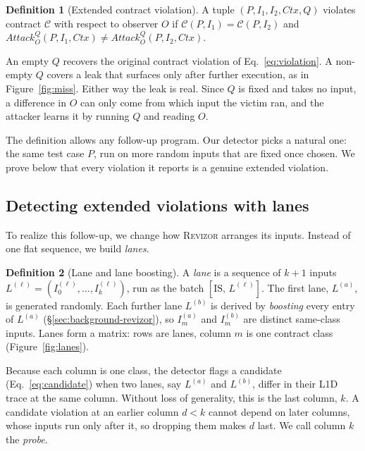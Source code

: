 \documentclass[letterpaper,twocolumn,10pt]{article}
\theoremstyle{definition}
\newtheorem{definition}{Definition}
\providecommand{\IS}{\ensuremath{\mathrm{IS}}}
\providecommand{\obs}{\ensuremath{O}}
\providecommand{\AQ}[1]{\ensuremath{\mathit{Attack}^{Q}_{#1}}}
\providecommand{\lane}[1]{\ensuremath{L^{(#1)}}}
\providecommand{\inp}[2]{\ensuremath{I_{#1}^{(#2)}}}
\providecommand{\batch}[1]{\ensuremath{[\IS,\,#1]}}
\providecommand{\dprobe}{\ensuremath{d}}
\begin{document}
\begin{definition}[Extended contract violation]
\label{def:extviolation}
A tuple $(P,I_1,I_2,\mathit{Ctx},Q)$ violates contract $\mathcal{C}$ with respect to
observer $\obs$ if $\mathcal{C}(P,I_1)=\mathcal{C}(P,I_2)$ and
$\AQ{\obs}(P,I_1,\mathit{Ctx})\neq\AQ{\obs}(P,I_2,\mathit{Ctx})$.
\end{definition}

An empty $Q$ recovers the original contract violation of Eq.~\eqref{eq:violation}. A non-empty
$Q$ covers a leak that surfaces only after further execution, as in Figure~\ref{fig:miss}. Either
way the leak is real. Since $Q$ is fixed and takes no input, a difference in $\obs$ can only come
from which input the victim ran, and the attacker learns it by running $Q$ and reading $\obs$.

The definition allows any follow-up program. Our detector picks a natural one: the same test case
$P$, run on more random inputs that are fixed once chosen. We prove below that every
violation it reports is a genuine extended violation.

\subsection{Detecting extended violations with lanes}
\label{sec:detect-construction}

To realize this follow-up, we change how \textsc{Revizor} arranges its inputs. Instead of one
flat sequence, we build \emph{lanes}.

\begin{definition}[Lane and lane boosting]
\label{def:lane}
A \emph{lane} is a sequence of $k+1$ inputs
$\lane{\ell}=(\inp{0}{\ell},\dots,\inp{k}{\ell})$, run as the batch $\batch{\lane{\ell}}$.
The first lane, $\lane{a}$, is generated randomly. Each further lane $\lane{b}$ is
derived by \emph{boosting} every entry of $\lane{a}$ (\S\ref{sec:background-revizor}), so $\inp{m}{a}$
and $\inp{m}{b}$ are distinct same-class inputs. Lanes form a matrix: rows are lanes,
column $m$ is one contract class (Figure~\ref{fig:lanes}).
\end{definition}

Because each column is one class, the detector flags a candidate (Eq.~\eqref{eq:candidate}) when
two lanes, say $\lane{a}$ and $\lane{b}$, differ in their L1D trace at the same column. Without
loss of generality, this is the last column, $k$. A candidate violation at an earlier column $\dprobe<k$
cannot depend on later columns, whose inputs run only after it, so dropping them makes $\dprobe$
last. We call column $k$ the \emph{probe}.
\end{document}
